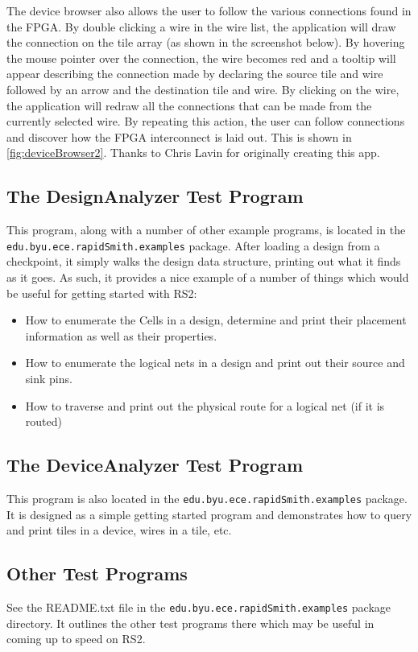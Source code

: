 \documentclass[12pt]{article}
\newcommand{\pkg}[1]{{\texttt{#1}}}
\newcommand{\pgm}[1]{{\textbf{#1}}}
\begin{document}
The device browser also allows the user to follow the various connections found
in the FPGA.  By double clicking a wire in the wire list, the application will
draw the connection on the tile array (as shown in the screenshot below).  By
hovering the mouse pointer over the connection, the wire becomes red and a
tooltip will appear describing the connection made by declaring the source tile
and wire followed by an arrow and the destination tile and wire.  By
clicking on the wire, the application will redraw all the connections that can
be made from the currently selected wire.  By repeating this action, the user
can follow connections and discover how the FPGA interconnect is laid out.  This
is shown in \autoref{fig:deviceBrowser2}.  Thanks to Chris Lavin for originally
creating this app.

\subsection{The \pgm{DesignAnalyzer} Test Program}
This program, along with a number of other example programs, is located in the\\
\pkg{edu.byu.ece.rapidSmith.examples} package.  After loading a design from a
checkpoint, it simply walks the design data structure, printing out what it
finds as it goes.  As such, it provides a nice example of a number of things
which would be useful for getting started with RS2:
\begin{itemize}
  \item How to enumerate the Cells in a design, determine and print their 
  placement information as well as their properties.
  \item How to enumerate the logical nets in a design and print out their source
  and sink pins. 
  \item How to traverse and print out the physical route for a logical net (if
  it is routed)  
\end{itemize}

\subsection{The \pgm{DeviceAnalyzer} Test Program}
This program is also located in the \pkg{edu.byu.ece.rapidSmith.examples}
package.  It is designed as a simple getting started program and demonstrates
how to query and print tiles in a device, wires in a tile, etc.

\subsection{Other Test Programs}
See the README.txt file in the \pkg{edu.byu.ece.rapidSmith.examples} package
directory.  It outlines the other test programs there which may be useful in
coming up to speed on RS2. 
\end{document}
